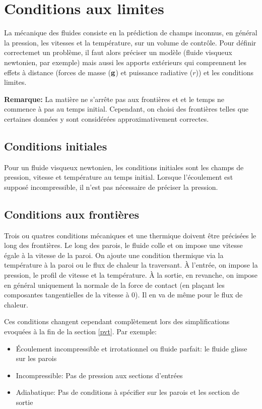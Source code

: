   \section{Conditions aux limites}
    La mécanique des fluides consiste en la prédiction de champs inconnus, en général la pression, les vitesses et la température, sur un volume de contrôle. Pour définir correctemet un problème, il faut alors préciser un modèle (fluide visqueux newtonien, par exemple) mais aussi les apports extérieurs qui comprennent les effets à distance (forces de masse ($\vb{g}$) et puissance radiative ($r$)) et les conditions limites.

    {\footnotesize \textbf{Remarque:} La matière ne s'arrête pas aux frontières et et le temps ne commence à pas au temps initial. Cependant, on choisi des frontières telles que certaines données y sont considérées approximativement correctes.}

    \subsection{Conditions initiales}
      Pour un fluide visqueux newtonien, les conditions initiales sont les champs de pression, vitesse et température au temps initial. Lorsque l'écoulement est supposé incompressible, il n'est pas nécessaire de préciser la pression.

    \subsection{Conditions aux frontières}
      Trois ou quatres conditions mécaniques et une thermique doivent être précisées le long des frontières. Le long des parois, le fluide colle et on impose une vitesse égale à la vitesse de la paroi. On ajoute une condition thermique via la température à la paroi ou le flux de chaleur la traversant. À l'entrée, on impose la pression, le profil de vitesse et la température. À la sortie, en revanche, on impose en général uniquement la normale de la force de contact (en plaçant les composantes tangentielles de la vitesse à $0$). Il en va de même pour le flux de chaleur.

      Ces conditions changent cependant complètement lors des simplifications evoquées à la fin de la section \ref{pvt}. Par exemple:
      \begin{itemize}
        \item Écoulement incompressible et irrotationnel ou fluide parfait: le fluide glisse sur les parois
        \item Incompressible: Pas de pression aux sections d'entrées
        \item Adiabatique: Pas de conditions à spécifier sur les parois et les section de sortie
      \end{itemize}

